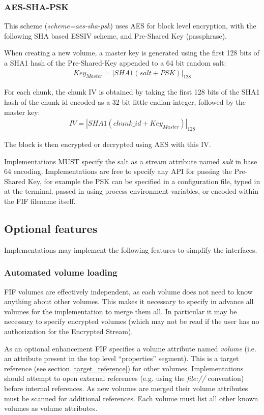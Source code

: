 \documentclass[10pt, conference]{IEEEtran}
\begin{document}
\subsubsection{AES-SHA-PSK}
This scheme ({\em scheme=aes-sha-psk}) uses AES for block level
encryption, with the following SHA based ESSIV scheme, and Pre-Shared
Key (passphrase).

When creating a new volume, a master key is generated using the first
128 bits of a SHA1 hash of the Pre-Shared-Key appended to a 64 bit
random salt:
\begin{eqnarray}
Key_{Master} = \left | SHA1(salt + PSK) \right | _{128}
\end{eqnarray}

For each chunk, the chunk IV is obtained by taking the first 128 bits
of the SHA1 hash of the chunk id encoded as a 32 bit little endian
integer, followed by the master key:
\begin{eqnarray}
IV = \left | SHA1(chunk\_id + Key_{Master}) \right | _{128}
\end{eqnarray}

The block is then encrypted or decrypted using AES with this IV.

Implementations MUST specify the salt as a stream attribute named {\em
salt} in base 64 encoding. Implementations are free to specify any API
for passing the Pre-Shared Key, for example the PSK can be specified
in a configuration file, typed in at the terminal, passed in using
process environment variables, or encoded within the FIF filename
itself.

\subsection{Optional features}
Implementations may implement the following features to simplify the
interfaces.

\subsubsection{Automated volume loading}
FIF volumes are effectively independent, as each volume does not need
to know anything about other volumes. This makes it necessary to
specify in advance all volumes for the implementation to merge them
all. In particular it may be necessary to specify encrypted volumes
(which may not be read if the user has no authorization for the
Encrypted Stream).

As an optional enhancement FIF specifies a volume attribute named {\em
volume} (i.e. an attribute present in the top level ``properties''
segment). This is a target reference (see section
\ref{target_reference}) for other volumes. 
Implementations should attempt to open external references (e.g. using
the {\em file://} convention) before internal references. As new
volumes are merged their volume attributes must be scanned for
additional references. Each volume must list all other known volumes
as volume attributes.
\end{document}
